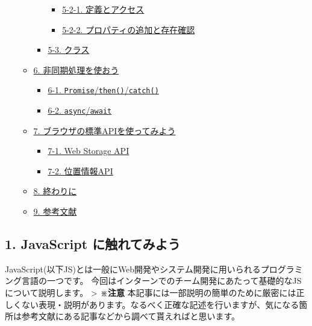 \begin{itemize}
\begin{itemize}
\begin{itemize}
      \begin{itemize}
      \tightlist
      \item
        \hyperref[5-2-1-ux5b9aux7fa9ux3068ux30a2ux30afux30bbux30b9]{5-2-1.
        定義とアクセス}
      \item
        \hyperref[5-2-2-ux30d7ux30edux30d1ux30c6ux30a3ux306eux8ffdux52a0ux3068ux5b58ux5728ux78baux8a8d]{5-2-2.
        プロパティの追加と存在確認}
      \end{itemize}
    \item
      \hyperref[5-3-ux30afux30e9ux30b9]{5-3. クラス}
    \end{itemize}
  \item
    \hyperref[6-ux975eux540cux671fux51e6ux7406ux3092ux4f7fux304aux3046]{6.
    非同期処理を使おう}

    \begin{itemize}
    \tightlist
    \item
      \hyperref[6-1-promisethencatch]{6-1.
      \texttt{Promise}/\texttt{then()}/\texttt{catch()}}
    \item
      \hyperref[6-2-asyncawait]{6-2. \texttt{async}/\texttt{await}}
    \end{itemize}
  \item
    \hyperref[7-ux30d6ux30e9ux30a6ux30b6ux306eux6a19ux6e96apiux3092ux4f7fux3063ux3066ux307fux3088ux3046]{7.
    ブラウザの標準APIを使ってみよう}

    \begin{itemize}
    \tightlist
    \item
      \hyperref[7-1-web-storage-api]{7-1. Web Storage API}
    \item
      \hyperref[7-2-ux4f4dux7f6eux60c5ux5831api]{7-2. 位置情報API}
    \end{itemize}
  \item
    \hyperref[8-ux7d42ux308fux308aux306b]{8. 終わりに}
  \item
    \hyperref[9-ux53c2ux8003ux6587ux732e]{9. 参考文献}
  \end{itemize}
\end{itemize}

\subsection{1. JavaScript
に触れてみよう}\label{javascript-ux306bux89e6ux308cux3066ux307fux3088ux3046}

JavaScript(以下JS)とは一般にWeb開発やシステム開発に用いられるプログラミング言語の一つです。
今回はインターンでのチーム開発にあたって基礎的なJSについて説明します。
\textgreater{} \textbf{※注意}
本記事には一部説明の簡単のために厳密には正しくない表現・説明があります。なるべく正確な記述を行いますが、気になる箇所は参考文献にある記事などから調べて貰えればと思います。

